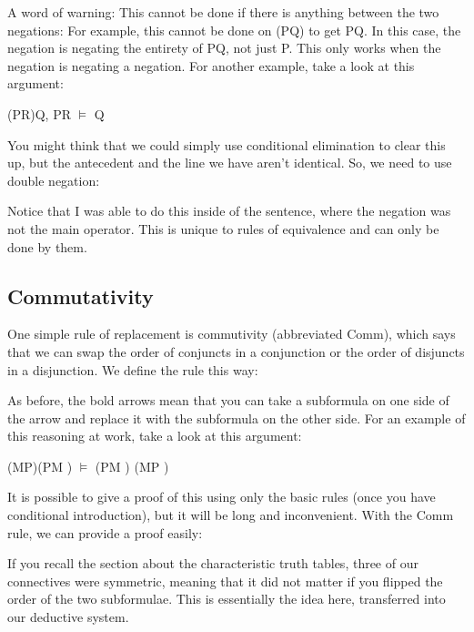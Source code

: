 A word of warning: This cannot be done if there is anything between the two negations: For example, this cannot be done on \enot (\enot P\eif Q) to get P\eif Q. In this case, the negation is negating the entirety of \enot P\eif Q, not just \enot P. This only works when the negation is negating a negation. For another example, take a look at this argument:
\begin{center}
(\enot \enot P\eand R)\eif Q, P\eand R $\vDash$ Q
\end{center}
You might think that we could simply use conditional elimination to clear this up, but the antecedent and the line we have aren't identical. So, we need to use double negation:
\begin{fitchproof}
 
\end{fitchproof}

Notice that I was able to do this inside of the sentence, where the negation was not the main operator. This is unique to rules of equivalence and can only be done by them.

\subsection{Commutativity}

One simple rule of replacement is commutivity (abbreviated Comm), which says that we can swap the order of conjuncts in a conjunction or the order of disjuncts in a disjunction. We define the rule this way:

As before, the bold arrows mean that you can take a subformula on one side of the arrow and replace it with the subformula on the other side. For an example of this reasoning at work, take a look at this argument:
\begin{center}
(M\eor P)\eif (P\eand M ) $\vDash$ (P\eor M ) \eif  (M\eand P )
\end{center}
It is possible to give a proof of this using only the basic rules (once you have conditional introduction), but it will be long and inconvenient. With the Comm rule, we can provide a proof easily:
\begin{fitchproof}
\end{fitchproof}
If you recall the section about the characteristic truth tables, three of our connectives were symmetric, meaning that it did not matter if you flipped the order of the two subformulae. This is essentially the idea here, transferred into our deductive system.
